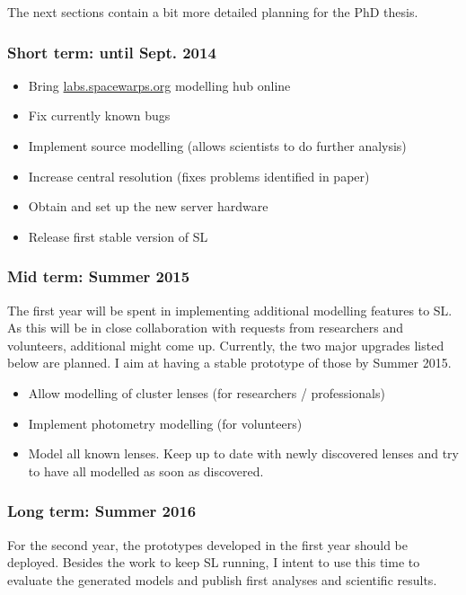\documentclass[11pt]{article}
\begin{document}
The next sections contain a bit more detailed planning for the PhD thesis.

\subsubsection{Short term: until Sept. 2014} \label{sec:plan_short}

\begin{itemize}
  \item Bring \url{labs.spacewarps.org} modelling hub online
  \item Fix currently known bugs
  \item Implement source modelling (allows scientists to do further analysis)
  \item Increase central resolution (fixes problems identified in paper)
  \item Obtain and set up the new server hardware
  \item Release first stable version of SL
\end{itemize}


\subsubsection{Mid term: Summer 2015}

The first year will be spent in implementing additional modelling features to SL.
As this will be in close collaboration with requests from researchers and volunteers, additional might come up.
Currently, the two major upgrades listed below are planned. I aim at having a stable prototype of those by Summer 2015.

\begin{itemize}
  \item Allow modelling of cluster lenses (for researchers / professionals)
  \item Implement photometry modelling (for volunteers)
  \item Model all known lenses. Keep up to date with newly discovered lenses and try to have all modelled as soon as discovered.
\end{itemize}


\subsubsection{Long term: Summer 2016}

For the second year, the prototypes developed in the first year should be deployed.
Besides the work to keep SL running, I intent to use this time to evaluate the generated models and publish first analyses and scientific results.
\end{document}

